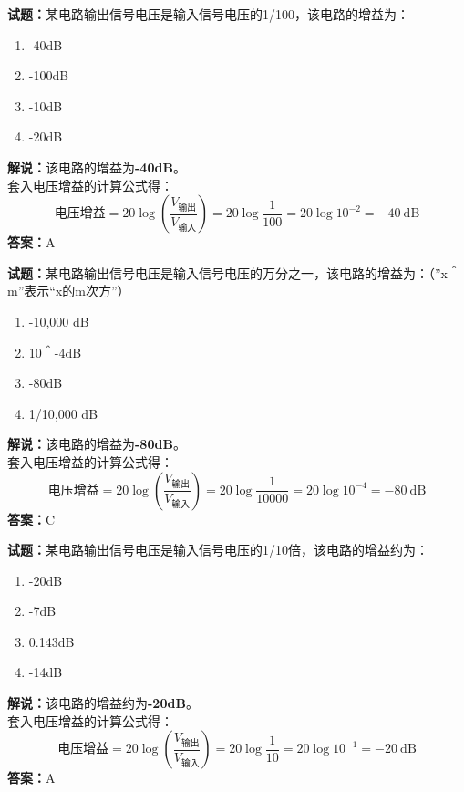 \documentclass{ctexbook}
\begin{document}
\vspace{\baselineskip}

\noindent\textbf{试题：}某电路输出信号电压是输入信号电压的1/100，该电路的增益为：
\begin{enumerate}[leftmargin=3em]
  \item -40dB
  \item -100dB
  \item -10dB
  \item -20dB
\end{enumerate}
\noindent\textbf{解说：}该电路的增益为\textbf{-40dB}。\\
套入电压增益的计算公式得：
$$\mbox{电压增益}=20 \log \left( {\frac{V_{ \mbox{输出} }}{V_{ \mbox{输入} }}} \right)=20 \log \frac{1}{100}=20 \log 10^{-2}= -40 \ \mathrm{dB}$$
\noindent\textbf{答案：}A

\vspace{\baselineskip}

\noindent\textbf{试题：}某电路输出信号电压是输入信号电压的万分之一，该电路的增益为：（”x＾m”表示“x的m次方”）
\begin{enumerate}[leftmargin=3em]
  \item -10,000 dB
  \item 10＾-4dB
  \item -80dB
  \item 1/10,000 dB
\end{enumerate}
\noindent\textbf{解说：}该电路的增益为\textbf{-80dB}。\\
套入电压增益的计算公式得：
$$\mbox{电压增益}=20 \log \left( {\frac{V_{ \mbox{输出} }}{V_{ \mbox{输入} }}} \right)=20 \log \frac{1}{10000}=20 \log 10^{-4}= -80 \ \mathrm{dB}$$
\noindent\textbf{答案：}C

\vspace{\baselineskip}

\noindent\textbf{试题：}某电路输出信号电压是输入信号电压的1/10倍，该电路的增益约为：
\begin{enumerate}[leftmargin=3em]
  \item -20dB
  \item -7dB
  \item 0.143dB
  \item -14dB
\end{enumerate}
\noindent\textbf{解说：}该电路的增益约为\textbf{-20dB}。\\
套入电压增益的计算公式得：
$$\mbox{电压增益}=20 \log \left( {\frac{V_{ \mbox{输出} }}{V_{ \mbox{输入} }}} \right)=20 \log \frac{1}{10}=20 \log 10^{-1}= -20 \ \mathrm{dB}$$
\noindent\textbf{答案：}A
\end{document}

